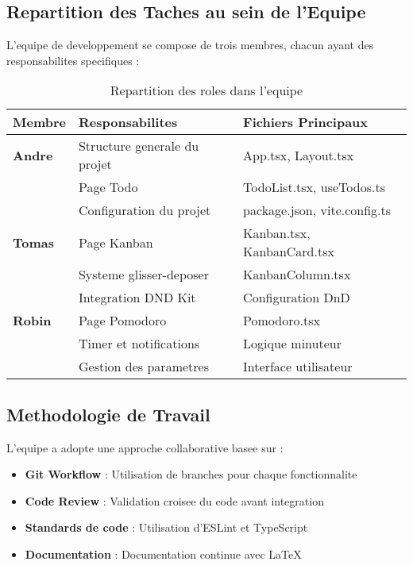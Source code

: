 \documentclass[12pt,a4paper]{article}
\begin{document}
\subsection{Repartition des Taches au sein de l'Equipe}

L'equipe de developpement se compose de trois membres, chacun ayant des responsabilites specifiques :

\begin{table}[H]
\centering
\begin{tabular}{|l|l|l|}
\hline
\textbf{Membre} & \textbf{Responsabilites} & \textbf{Fichiers Principaux} \\
\hline
\textbf{Andre} & Structure generale du projet & App.tsx, Layout.tsx \\
 & Page Todo & TodoList.tsx, useTodos.ts \\
 & Configuration du projet & package.json, vite.config.ts \\
\hline
\textbf{Tomas} & Page Kanban & Kanban.tsx, KanbanCard.tsx \\
 & Systeme glisser-deposer & KanbanColumn.tsx \\
 & Integration DND Kit & Configuration DnD \\
\hline
\textbf{Robin} & Page Pomodoro & Pomodoro.tsx \\
 & Timer et notifications & Logique minuteur \\
 & Gestion des parametres & Interface utilisateur \\
\hline
\end{tabular}
\caption{Repartition des roles dans l'equipe}
\label{tab:roles}
\end{table}

\subsection{Methodologie de Travail}

L'equipe a adopte une approche collaborative basee sur :
\begin{itemize}
    \item \textbf{Git Workflow} : Utilisation de branches pour chaque fonctionnalite
    \item \textbf{Code Review} : Validation croisee du code avant integration
    \item \textbf{Standards de code} : Utilisation d'ESLint et TypeScript
    \item \textbf{Documentation} : Documentation continue avec LaTeX
\end{itemize}
\end{document}
